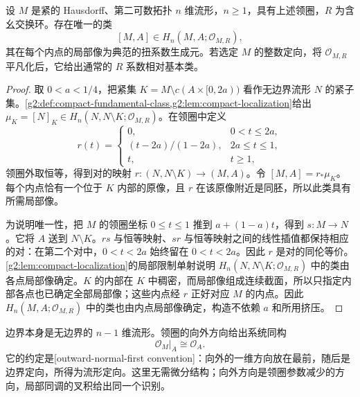 \begin{proposition}\label{g2:prop:relative-fundamental-class}
	设 \(M\) 是紧的 Hausdorff、第二可数拓扑 \(n\) 维流形，\(n\geq1\)，具有上述领圈，\(R\) 为含幺交换环。存在唯一的类
	\[
		[M,A]\in H_n(M,A;\mathcal O_{M,R}),
	\]
	其在每个内点的局部像为典范的扭系数生成元。若选定 \(M\) 的整数定向，将 \(\mathcal O_{M,R}\) 平凡化后，它给出通常的 \(R\) 系数相对基本类。
\end{proposition}
\begin{proof}
	取 \(0<a<1/4\)，把紧集 \(K=M\setminus c(A\times[0,2a))\) 看作无边界流形 \(N\) 的紧子集。\cref{g2:def:compact-fundamental-class,g2:lem:compact-localization}给出 \(\mu_K=[N]_K\in H_n(N,N\setminus K;\mathcal O_{M,R})\)。在领圈中定义
	\[
		r(t)=
		\begin{cases}
			0,&0<t\leq2a,\\
			(t-2a)/(1-2a),&2a\leq t\leq1,\\
			t,&t\geq1,
		\end{cases}
	\]
	领圈外取恒等，得到对的映射 \(r:(N,N\setminus K)\to(M,A)\)。令 \([M,A]=r_*\mu_K\)。每个内点恰有一个位于 \(K\) 内部的原像，且 \(r\) 在该原像附近是同胚，所以此类具有所需局部像。

	为说明唯一性，把 \(M\) 的领圈坐标 \(0\leq t\leq1\) 推到 \(a+(1-a)t\)，得到 \(s:M\to N\)。它将 \(A\) 送到 \(N\setminus K\)。\(rs\) 与恒等映射、\(sr\) 与恒等映射之间的线性插值都保持相应的对：在第二个对中，\(0<t<2a\) 始终留在 \(0<t<2a\)。因此 \(r\) 是对的同伦等价。\cref{g2:lem:compact-localization}的局部限制单射说明 \(H_n(N,N\setminus K;\mathcal O_{M,R})\) 中的类由各点局部像确定。\(K\) 的内部在 \(K\) 中稠密，而局部像组成连续截面，所以只指定内部各点也已确定全部局部像；这些内点经 \(r\) 正好对应 \(M\) 的内点。因此 \(H_n(M,A;\mathcal O_{M,R})\) 中的类也由内点局部像确定，构造不依赖 \(a\) 和所用挤压。
\end{proof}

边界本身是无边界的 \(n-1\) 维流形。领圈的向外方向给出系统同构
\[
	\mathcal O_M|_A\cong\mathcal O_A.
\]
它的约定是[outward-normal-first convention]：向外的一维方向放在最前，随后是边界定向，所得为流形定向。这里无需微分结构；向外方向是领圈参数减少的方向，局部同调的叉积给出同一个识别。

